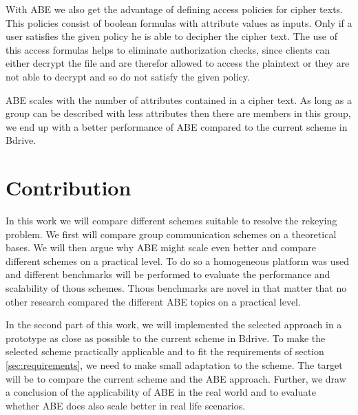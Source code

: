 With ABE we also get the advantage of defining access policies for cipher texts. This policies consist of boolean formulas with attribute values as inputs. Only if a user satisfies the given policy he is able to decipher the cipher text. The use of this access formulas helps to eliminate authorization checks, since clients can either decrypt the file and are therefor allowed to access the plaintext or they are not able to decrypt and so do not satisfy the given policy. 


ABE scales with the number of attributes contained in a cipher text. As long as a group can be described with less attributes then there are members in this group, we end up with a better performance of ABE compared to the current scheme in Bdrive. 

\section{Contribution}
In this work we will compare different schemes suitable to resolve the rekeying problem. We first will compare group communication schemes on a theoretical bases. We will then argue why ABE might scale even better and compare different schemes on a practical level. To do so a homogeneous platform was used and different benchmarks will be performed to evaluate the performance and scalability of thous schemes. Thous benchmarks are novel in that matter that no other research compared the different ABE topics on a practical level.  

In the second part of this work, we will implemented the selected approach in a prototype as close as possible to the current scheme in Bdrive. To make the selected scheme practically applicable and to fit the requirements of section \ref{sec:requirements}, we need to make small adaptation to the scheme. The target will be to compare the current scheme and the ABE approach. Further, we draw a conclusion of the applicability of ABE in the real world and to evaluate whether ABE does also scale better in real life scenarios. 